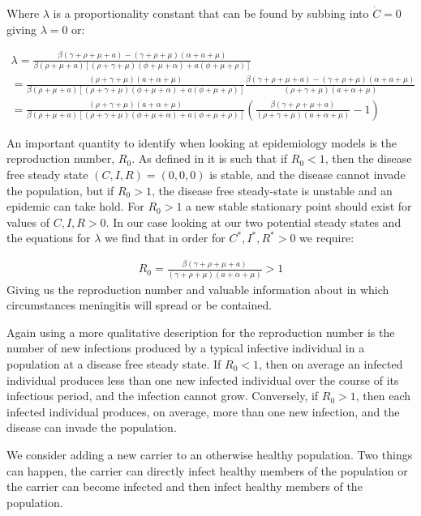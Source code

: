 \documentclass[11pt]{article} %
\begin{document}
	Where $ \lambda $ is a proportionality constant that can be found by subbing into $  \dot{C}=0 $ giving $ \lambda=0 $ or:
	
	\begin{eqnarray}
	\lambda=\frac{\beta(\gamma+\rho+\mu+a)-(\gamma+\rho+\mu)(\alpha+a+\mu)}{\beta(\rho+\mu+a)[(\rho+\gamma+\mu)(\phi+\mu+\alpha)+a(\phi+\mu+\rho)]}\\
	=\frac{(\rho+\gamma+\mu)(a+\alpha+\mu)}{\beta(\rho+\mu+a)[(\rho+\gamma+\mu)(\phi+\mu+\alpha)+a(\phi+\mu+\rho)]}\frac{\beta(\gamma+\rho+\mu+a)-(\gamma+\rho+\mu)(\alpha+a+\mu)}{(\rho+\gamma+\mu)(a+\alpha+\mu)}\\
	=\frac{(\rho+\gamma+\mu)(a+\alpha+\mu)}{\beta(\rho+\mu+a)[(\rho+\gamma+\mu)(\phi+\mu+\alpha)+a(\phi+\mu+\rho)]}\left( \frac{\beta(\gamma+\rho+\mu+a)}{(\rho+\gamma+\mu)(a+\alpha+\mu)}-1\right) 
	\end{eqnarray}
	
	
	An important quantity to identify when looking at epidemiology models is the reproduction number,  $  R_0 $. As defined in \cite{VanDenDriessche} it is such that if $ R_0 < 1 $, then the disease free  steady state $ (C,I,R)=(0,0,0) $ is stable, and the disease cannot invade the population, but if $  R_0 > 1 $, the disease free steady-state is unstable and an epidemic can take hold. 
	For $ R_0>1 $ a new stable stationary point should exist for values of $ C,I,R>0 $.
	In our case looking at our two potential steady states and the equations for $\lambda$ we find that in order for $C^*, I^*, R^*>0$ we require: 
	
	\begin{eqnarray}
	R_0=\frac{\beta(\gamma+\rho+\mu+a)}{(\gamma+\rho+\mu)(a+\alpha+\mu )}>1
	\end{eqnarray}
	Giving us the reproduction number and valuable information about in which circumstances meningitis will spread or be contained. 
	
Again using \cite{VanDenDriessche}  a more qualitative description for the reproduction number is  the number of new infections produced by a typical infective individual in a population at a disease free steady state.  If $ R_0 < 1 $, then on average an infected individual produces less than one new infected	individual over the course of its infectious period, and the infection cannot grow. Conversely, if 	$ R_0 > 1 $, then each infected individual produces, on average, more than one new infection, and the disease can invade the population. 


We consider adding a new carrier to an otherwise healthy population. Two things can happen, the carrier can directly infect healthy members of the population or the carrier can become infected and then infect healthy members of the population. 
\end{document}
